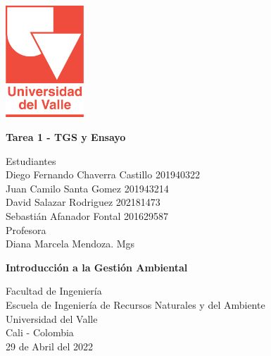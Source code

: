 \begin{titlepage}
    \begin{center}
        \vspace*{1cm}

        \begin{Huge}
        \end{Huge}

        \includegraphics[width=0.22\textwidth]{img/universidadDelValle.png}
        
        \vfill
        \textbf{Tarea 1 - TGS y Ensayo}\\
        \vfill
        
        Estudiantes\\
        Diego Fernando Chaverra Castillo 201940322\\
        Juan Camilo Santa Gomez 201943214\\
        David Salazar Rodriguez 202181473\\
        Sebastián Afanador Fontal 201629587\\
        \vfill
        Profesora\\
        Diana Marcela Mendoza. Mgs
        
        
        \vfill

        \textbf{Introducción a la Gestión Ambiental}
        
        \vfill
           
        Facultad de Ingeniería\\
        Escuela de Ingeniería de Recursos Naturales y del Ambiente\\
        Universidad del Valle\\
        Cali - Colombia\\
        \vfill
        29 de Abril del 2022

    \end{center}
\end{titlepage}